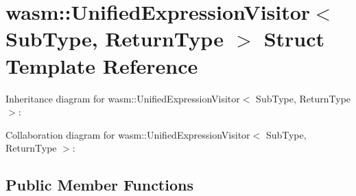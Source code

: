 \hypertarget{structwasm_1_1_unified_expression_visitor}{}\section{wasm\+:\+:Unified\+Expression\+Visitor$<$ Sub\+Type, Return\+Type $>$ Struct Template Reference}
\label{structwasm_1_1_unified_expression_visitor}


Inheritance diagram for wasm\+:\+:Unified\+Expression\+Visitor$<$ Sub\+Type, Return\+Type $>$\+:


Collaboration diagram for wasm\+:\+:Unified\+Expression\+Visitor$<$ Sub\+Type, Return\+Type $>$\+:
\subsection*{Public Member Functions}
